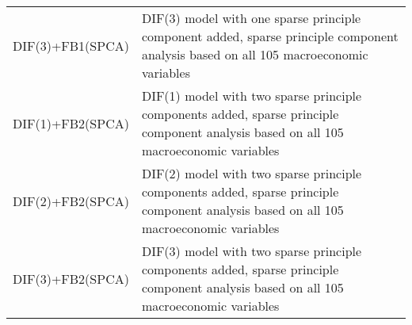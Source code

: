 \begin{table}[h]
{\begin{tabular}{ll}
DIF(3)+FB1(SPCA)          & DIF(3) model with one sparse principle component added, sparse principle component analysis based on all 105 macroeconomic variables \\
DIF(1)+FB2(SPCA)          & DIF(1) model with two sparse principle components added, sparse principle component analysis based on all 105 macroeconomic variables \\
DIF(2)+FB2(SPCA)          & DIF(2) model with two sparse principle components added, sparse principle component analysis based on all 105 macroeconomic variables \\
DIF(3)+FB2(SPCA)          & DIF(3) model with two sparse principle components added, sparse principle component analysis based on all 105 macroeconomic variables \\
\bottomrule
\end{tabular}%
}
\end{table}